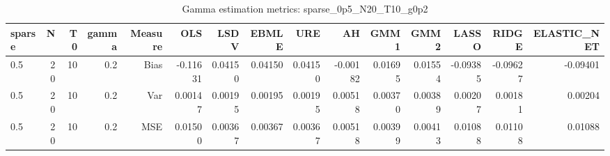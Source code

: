\begin{table}[!htbp]\centering
\caption{Gamma estimation metrics: sparse_0p5_N20_T10_g0p2}
\label{tab:table1_sparse_0p5_N20_T10_g0p2}
\begin{tabular}{lrrrrrrrrrrrrrr}
\hline
sparse & N & T0 & gamma & Measure & OLS & LSDV & EBMLE & URE & AH & GMM1 & GMM2 & LASSO & RIDGE & ELASTIC_NET \\
\hline
0.5 & 20 & 10 & 0.2 & Bias & -0.11631 & 0.04150 & 0.04150 & 0.04150 & -0.00182 & 0.01695 & 0.01554 & -0.09385 & -0.09627 & -0.09401 \\
0.5 & 20 & 10 & 0.2 & Var & 0.00147 & 0.00195 & 0.00195 & 0.00195 & 0.00518 & 0.00370 & 0.00389 & 0.00207 & 0.00181 & 0.00204 \\
0.5 & 20 & 10 & 0.2 & MSE & 0.01500 & 0.00367 & 0.00367 & 0.00367 & 0.00518 & 0.00399 & 0.00413 & 0.01088 & 0.01108 & 0.01088 \\
\hline
\end{tabular}
\end{table}

